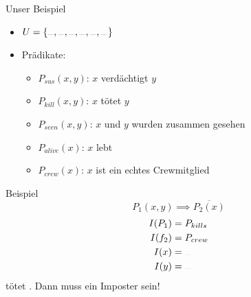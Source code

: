 \begin{frame}{Unser Beispiel}
    \begin{itemize}
        \item $U = \{\sus{red}, \sus{green}, \sus{blue}, \sus{white}, \sus{yellow}, \sus{magenta}\}$
        \item Prädikate:
        \begin{itemize}
            \item $P_{sus}(x,y)$: $x$ verdächtigt $y$
            \item $P_{kill}(x,y)$: $x$ tötet $y$
            \item $P_{seen}(x,y)$: $x$ und $y$ wurden zusammen gesehen
            \item $P_{alive}(x)$: $x$ lebt
            \item $P_{crew}(x)$: $x$ ist ein echtes Crewmitglied
        \end{itemize}
    \end{itemize}
\end{frame}

\begin{frame}{Beispiel}
    $$P_1(x,y) \implies \overline{P_2(x)}$$
    \pause    
    \begin{align*}
            I(P_1) &= P_{kills}\\
            I(f_2) &= P_{crew}\\
            I(x) &= \sus{red}\\
            I(y) &= \sus{white}
        \end{align*}
        \pause
         tötet . Dann muss  ein Imposter sein!
\end{frame}

